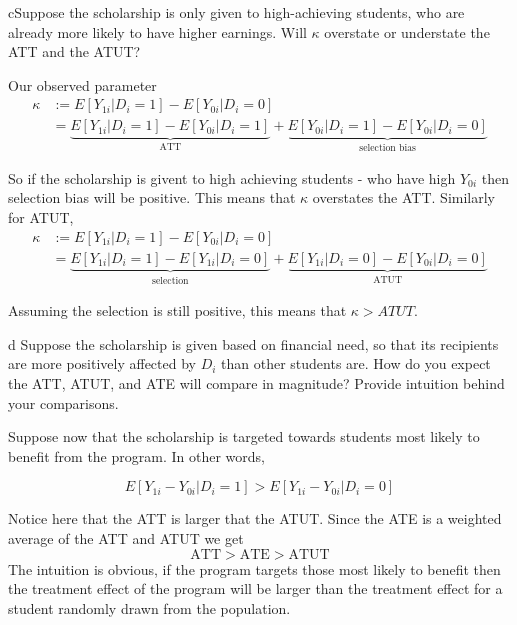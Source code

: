 \documentclass{article}
\begin{document}
\begin{problem}{c}Suppose the scholarship is only given to high-achieving students, who are already more likely to have higher earnings. Will $\kappa$ overstate or understate the ATT and the ATUT?
\end{problem}
\begin{solution}
Our observed parameter
\begin{align*}
\kappa & :=E\left[Y_{1i}|D_{i}=1\right]-E\left[Y_{0i}|D_{i}=0\right]\\
 & =\underbrace{E\left[Y_{1i}|D_{i}=1\right]-E\left[Y_{0i}|D_{i}=1\right]}_{\text{ATT}}+\underbrace{E\left[Y_{0i}|D_{i}=1\right]-E\left[Y_{0i}|D_{i}=0\right]}_{\text{selection bias}}
\end{align*}

So if the scholarship is givent to high achieving students - who have
high $Y_{0i}$ then selection bias will be positive. This means that
$\kappa$ overstates the ATT. Similarly for ATUT,
\begin{align*}
\kappa & :=E\left[Y_{1i}|D_{i}=1\right]-E\left[Y_{0i}|D_{i}=0\right]\\
 & =\underbrace{E\left[Y_{1i}|D_{i}=1\right]-E\left[Y_{1i}|D_{i}=0\right]}_{\text{selection}}+\underbrace{E\left[Y_{1i}|D_{i}=0\right]-E\left[Y_{0i}|D_{i}=0\right]}_{\text{ATUT}}
\end{align*}

Assuming the selection is still positive, this means that $\kappa>ATUT$.
\end{solution}
\begin{problem}{d} Suppose the scholarship is given based on financial need, so that its recipients are more positively affected by $D_{i}$ than other students are. How do you expect the ATT, ATUT, and ATE will compare in magnitude? Provide intuition behind your comparisons.
\end{problem}
\begin{solution}
Suppose now that the scholarship is targeted towards students most
likely to benefit from the program. In other words,

\[
E\left[Y_{1i}-Y_{0i}|D_{i}=1\right]>E\left[Y_{1i}-Y_{0i}|D_{i}=0\right]
\]

Notice here that the ATT is larger that the ATUT. Since the ATE is
a weighted average of the ATT and ATUT we get
\[
\text{ATT}>\text{ATE}>\text{ATUT}
\]
The intuition is obvious, if the program targets those most likely
to benefit then the treatment effect of the program will be larger
than the treatment effect for a student randomly drawn from the population.
\end{solution}
\end{document}
